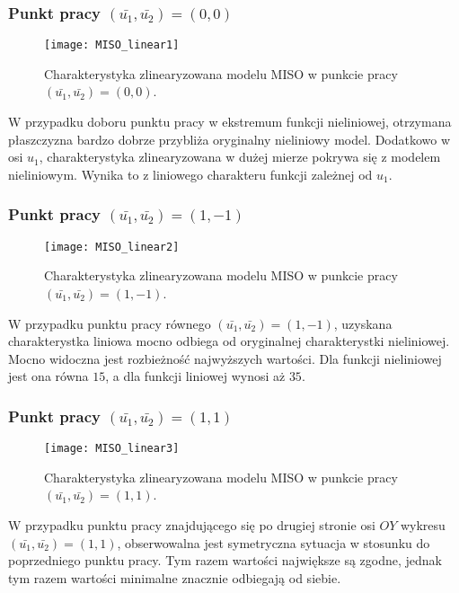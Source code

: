 \documentclass[11pt,a4paper]{article}
\begin{document}
\subsubsection{Punkt pracy $(\bar{u_{1}},\bar{u_{2}}) = (0,0)$}

\begin{figure}[h]
\texttt{[image: MISO\_linear1]}
\caption{Charakterystyka zlinearyzowana modelu MISO w punkcie pracy $(\bar{u_{1}},\bar{u_{2}}) = (0,0)$.}
\end{figure}

\indent \indent W przypadku doboru punktu pracy w ekstremum funkcji nieliniowej, otrzymana płaszczyzna bardzo dobrze przybliża oryginalny nieliniowy model. Dodatkowo w osi $u_{1}$, charakterystyka zlinearyzowana w dużej mierze pokrywa się z modelem nieliniowym. Wynika to z liniowego charakteru funkcji zależnej od $u_{1}$. 
\newpage

\subsubsection{Punkt pracy $(\bar{u_{1}},\bar{u_{2}}) = (1,-1)$}

\begin{figure}[h]
\texttt{[image: MISO\_linear2]}
\caption{Charakterystyka zlinearyzowana modelu MISO w punkcie pracy $(\bar{u_{1}},\bar{u_{2}}) = (1,-1)$.}
\end{figure}

\indent \indent W przypadku punktu pracy równego $(\bar{u_{1}},\bar{u_{2}}) = (1,-1)$, uzyskana charakterystka liniowa mocno odbiega od oryginalnej charakterystki nieliniowej. Mocno widoczna jest rozbieżność najwyższych wartości. Dla funkcji nieliniowej jest ona równa $15$, a dla funkcji liniowej wynosi aż $35$.  
\newpage

\subsubsection{Punkt pracy $(\bar{u_{1}},\bar{u_{2}}) = (1,1)$}

\begin{figure}[h]
\texttt{[image: MISO\_linear3]}
\caption{Charakterystyka zlinearyzowana modelu MISO w punkcie pracy $(\bar{u_{1}},\bar{u_{2}}) = (1,1)$.}
\end{figure}

\indent \indent W przypadku punktu pracy znajdującego się po drugiej stronie osi $OY$ wykresu $(\bar{u_{1}},\bar{u_{2}}) = (1,1)$, obserwowalna jest symetryczna sytuacja w stosunku do poprzedniego punktu pracy. Tym razem wartości największe są zgodne, jednak tym razem wartości minimalne znacznie odbiegają od siebie.
\newpage
\end{document}
